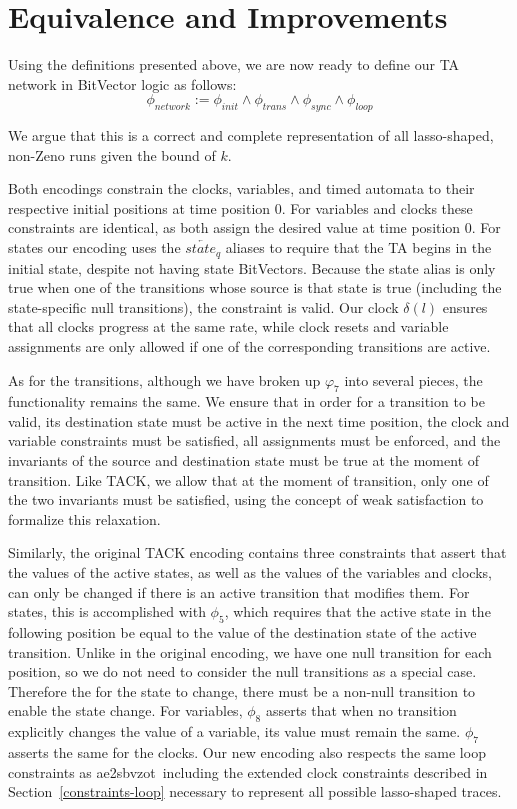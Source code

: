 \documentclass[a4paper,11pt]{report}
\theoremstyle{definition}
\newcommand{\aez}{ae2sbvzot}
\begin{document}
\section{Equivalence and Improvements}\label{equivalence}

Using the definitions presented above, we are now ready to define our TA network
in BitVector logic as follows:
\[\phi_{network} := \phi_{init} \land \phi_{trans} \land \phi_{sync} \land \phi_{loop}\]

We argue that this is a correct and complete representation of all lasso-shaped,
non-Zeno runs given the bound of \(k\).

Both encodings constrain the clocks, variables, and timed automata to their
respective initial positions at time position 0. For variables and clocks these
constraints are identical, as both assign the desired value at time position 0.
For states our encoding uses the \(\overleftarrow{state_{q}}\) aliases to
require that the TA begins in the initial state, despite not having state
BitVectors. Because the state alias is only true when one of the transitions
whose source is that state is true (including the state-specific null
transitions), the constraint is valid. Our clock \(\delta(l)\) ensures that all
clocks progress at the same rate, while clock resets and variable assignments
are only allowed if one of the corresponding transitions are active.

As for the transitions, although we have broken up \(\varphi_{7}\) into several
pieces, the functionality remains the same. We ensure that in order for a
transition to be valid, its destination state must be active in the next time
position, the clock and variable constraints must be satisfied, all assignments
must be enforced, and the invariants of the source and destination state must be
true at the moment of transition. Like TACK, we allow that at the moment of
transition, only one of the two invariants must be satisfied, using the concept
of weak satisfaction to formalize this relaxation.

Similarly, the original TACK encoding contains three constraints that assert that
the values of the active states, as well as the values of the variables and
clocks, can only be changed if there is an active transition that modifies them.
For states, this is accomplished with $\phi_{5}$, which requires that the active
state in the following position be equal to the value of the destination state
of the active transition. Unlike in the original encoding, we have one null
transition for each position, so we do not need to consider the null transitions
as a special case. Therefore the for the state to change, there must be a
non-null transition to enable the state change. For variables, $\phi_{8}$
asserts that when no transition explicitly changes the value of a variable, its
value must remain the same. $\phi_{7}$ asserts the same for the clocks. Our new
encoding also respects the same loop constraints as \aez\, including the
extended clock constraints described in Section~\ref{constraints-loop} necessary
to represent all possible lasso-shaped traces.
\end{document}
